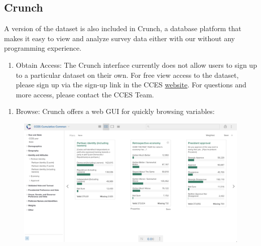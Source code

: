 \documentclass[10pt,article,oneside]{memoir}
\theoremstyle{definition}
\begin{document}
\hypertarget{crunch}{%
\subsection{Crunch}\label{crunch}}

A version of the dataset is also included in Crunch, a database platform
that makes it easy to view and analyze survey data either with our
without any programming experience.

\begin{enumerate}
\def\labelenumi{\arabic{enumi}.}
\tightlist
\item
  Obtain Access: The Crunch interface currently does not allow users to
  sign up to a particular dataset on their own. For free view access to
  the dataset, please sign up via the sign-up link in the CCES
  \href{https://cces.gov.harvard.edu/explore}{website}. For questions
  and more access, please contact the CCES Team.
\end{enumerate}

\newpage

\begin{enumerate}
\def\labelenumi{\arabic{enumi}.}
\setcounter{enumi}{1}
\tightlist
\item
  Browse: Crunch offers a web GUI for quickly browsing variables:
\end{enumerate}

\begin{figure}[H]
\centering
\centerline{\includegraphics[width=1.05\linewidth]{01_crunch_browse.png}}
\end{figure}
\end{document}
